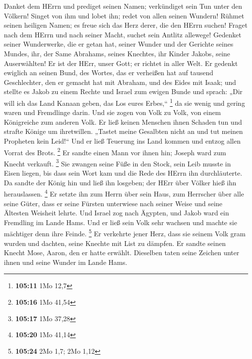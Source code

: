  Danket dem HErrn und prediget seinen Namen; verkündiget
sein Tun unter den Völkern!  Singet von ihm und lobet ihn;
redet von allen seinen Wundern!  Rühmet seinen heiligen
Namen; es freue sich das Herz derer, die den HErrn suchen!
 Fraget nach dem HErrn und nach seiner Macht, suchet sein
Antlitz allewege!  Gedenket seiner Wunderwerke, die er
getan hat, seiner Wunder und der Gerichte seines Mundes, 
ihr, der Same Abrahams, seines Knechtes, ihr Kinder Jakobs, seine
Auserwählten!  Er ist der HErr, unser Gott; er richtet in
aller Welt.  Er gedenkt ewiglich an seinen Bund, des
Wortes, das er verheißen hat auf tausend Geschlechter, 
den er gemacht hat mit Abraham, und des Eides mit Isaak; 
und stellte es Jakob zu einem Rechte und Israel zum ewigen Bunde
 und sprach: „Dir will ich das Land Kanaan geben, das Los
eures Erbes,`` \footnote{\textbf{105:11} 1Mo 12,7}  da
sie wenig und gering waren und Fremdlinge darin.  Und sie
zogen von Volk zu Volk, von einem Königreiche zum anderen Volk.
 Er ließ keinen Menschen ihnen Schaden tun und strafte
Könige um ihretwillen.  „Tastet meine Gesalbten nicht an
und tut meinen Propheten kein Leid!{}``  Und er ließ
Teuerung ins Land kommen und entzog allen Vorrat des Brots. \footnote{\textbf{105:16}
  1Mo 41,54}  Er sandte einen Mann vor ihnen hin; Joseph
ward zum Knecht verkauft. \footnote{\textbf{105:17} 1Mo 37,28}
 Sie zwangen seine Füße in den Stock, sein Leib musste in
Eisen liegen,  bis dass sein Wort kam und die Rede des
HErrn ihn durchläuterte.  Da sandte der König hin und
ließ ihn losgeben; der HErr über Völker hieß ihn herauslassen.
\footnote{\textbf{105:20} 1Mo 41,14}  Er setzte ihn zum
Herrn über sein Haus, zum Herrscher über alle seine Güter,
 dass er seine Fürsten unterwiese nach seiner Weise und
seine Ältesten Weisheit lehrte.  Und Israel zog nach
Ägypten, und Jakob ward ein Fremdling im Lande Hams.  Und
er ließ sein Volk sehr wachsen und machte sie mächtiger denn ihre
Feinde. \footnote{\textbf{105:24} 2Mo 1,7; 2Mo 1,12}  Er
verkehrte jener Herz, dass sie seinem Volk gram wurden und dachten,
seine Knechte mit List zu dämpfen.  Er sandte seinen
Knecht Mose, Aaron, den er hatte erwählt.  Dieselben
taten seine Zeichen unter ihnen und seine Wunder im Lande Hams.
